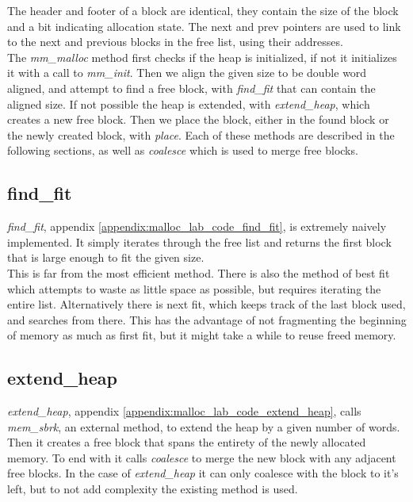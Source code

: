 \documentclass[11pt]{report}
\begin{document}
The header and footer of a block are identical, they contain the size of the block and a bit indicating allocation state. The next and prev pointers are used to link to the next and previous blocks in the free list, using their addresses.\\[1ex]

The \textit{mm\_malloc} method first checks if the heap is initialized, if not it initializes it with a call to \textit{mm\_init}. Then we align the given size to be double word aligned, and attempt to find a free block, with \textit{find\_fit} that can contain the aligned size. If not possible the heap is extended, with \textit{extend\_heap}, which creates a new free block. Then we place the block, either in the found block or the newly created block, with \textit{place}. Each of these methods are described in the following sections, as well as \textit{coalesce} which is used to merge free blocks. 

\subsection{find\_fit}
\textit{find\_fit}, appendix \ref{appendix:malloc_lab_code_find_fit}, is extremely naively implemented. It simply iterates through the free list and returns the first block that is large enough to fit the given size.\\[1ex]

This is far from the most efficient method. There is also the method of best fit which attempts to waste as little space as possible, but requires iterating the entire list. Alternatively there is next fit, which keeps track of the last block used, and searches from there. This has the advantage of not fragmenting the beginning of memory as much as first fit, but it might take a while to reuse freed memory.

\subsection{extend\_heap}
\textit{extend\_heap}, appendix \ref{appendix:malloc_lab_code_extend_heap}, calls \textit{mem\_sbrk}, an external method, to extend the heap by a given number of words. Then it creates a free block that spans the entirety of the newly allocated memory. To end with it calls \textit{coalesce} to merge the new block with any adjacent free blocks. In the case of \textit{extend\_heap} it can only coalesce with the block to it's left, but to not add complexity the existing method is used.\\[1ex]
\end{document}

